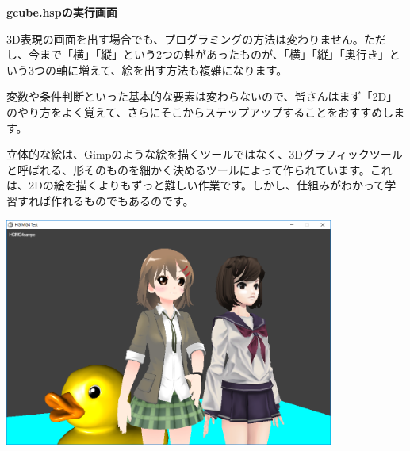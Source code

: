 \documentclass[a4paper,dvipdfmx]{jarticle}
\newcommand\textstyleqwerty[1]{#1}
\begin{document}
\bigskip


\bigskip

\textstyleqwerty{\textbf{gcube.hspの実行画面}}


\bigskip


\bigskip


\bigskip


\bigskip

3D表現の画面を出す場合でも、プログラミングの方法は変わりません。ただし、今まで「横」「縦」という2つの軸があったものが、「横」「縦」「奥行き」という3つの軸に増えて、絵を出す方法も複雑になります。

変数や条件判断といった基本的な要素は変わらないので、皆さんはまず「2D」のやり方をよく覚えて、さらにそこからステップアップすることをおすすめします。

立体的な絵は、Gimpのような絵を描くツールではなく、3Dグラフィックツールと呼ばれる、形そのものを細かく決めるツールによって作られています。これは、2Dの絵を描くよりもずっと難しい作業です。しかし、仕組みがわかって学習すれば作れるものでもあるのです。


\bigskip



\begin{center}
\includegraphics[width=10.834cm,height=7.514cm]{text04-img/text04-img035.png}

\end{center}

\bigskip


\bigskip


\bigskip


\bigskip


\bigskip


\bigskip


\bigskip


\bigskip
\end{document}

